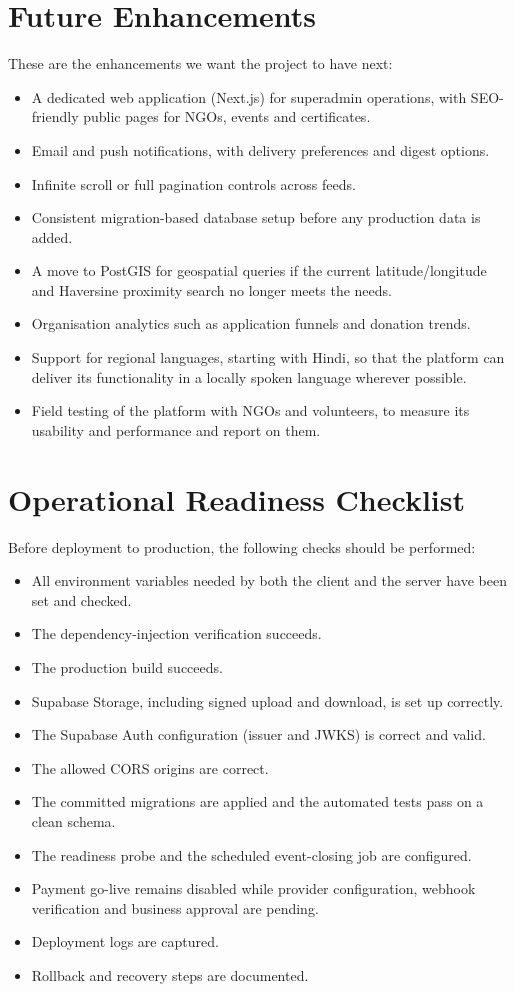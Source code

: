 \section{Future Enhancements}
\label{sec:future}
These are the enhancements we want the project to have next:
\begin{itemize}
  \item A dedicated web application (Next.js) for superadmin operations, with SEO-friendly public pages for NGOs, events and certificates.
  \item Email and push notifications, with delivery preferences and digest options.
  \item Infinite scroll or full pagination controls across feeds.
  \item Consistent migration-based database setup before any production data is added.
  \item A move to PostGIS for geospatial queries if the current latitude/longitude and Haversine proximity search no longer meets the needs.
  \item Organisation analytics such as application funnels and donation trends.
  \item Support for regional languages, starting with Hindi, so that the platform can deliver its functionality in a locally spoken language wherever possible.
  \item Field testing of the platform with NGOs and volunteers, to measure its usability and performance and report on them.
\end{itemize}

\section{Operational Readiness Checklist}
Before deployment to production, the following checks should be performed:
\begin{itemize}
  \item All environment variables needed by both the client and the server have been set and checked.
  \item The dependency-injection verification succeeds.
  \item The production build succeeds.
  \item Supabase Storage, including signed upload and download, is set up correctly.
  \item The Supabase Auth configuration (issuer and JWKS) is correct and valid.
  \item The allowed CORS origins are correct.
  \item The committed migrations are applied and the automated tests pass on a clean schema.
  \item The readiness probe and the scheduled event-closing job are configured.
  \item Payment go-live remains disabled while provider configuration, webhook verification and business approval are pending.
  \item Deployment logs are captured.
  \item Rollback and recovery steps are documented.
\end{itemize}

